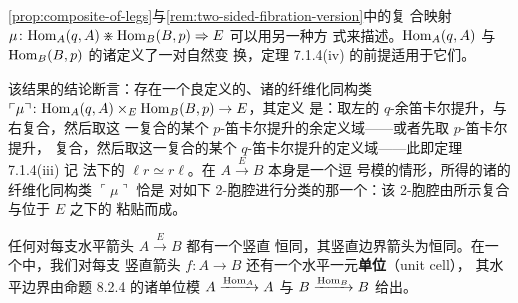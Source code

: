 \begin{remark}\label{rem:comma-cone-description}
\cref{prop:composite-of-legs}与\cref{rem:two-sided-fibration-version}中的复
合映射 $\mu\colon \mathrm{Hom}_{A}(q,A)\divideontimes \mathrm{Hom}_{B}(B,p)\Rightarrow E$ 可以用另一种方
式来描述。$\mathrm{Hom}_{A}(q,A)$ 与 $\mathrm{Hom}_{B}(B,p)$ 的诸\trCommaCone{}定义了一对自然变
换，定理 7.1.4(iv) 的前提适用于它们。
\begin{center}
\end{center}
该结果的结论断言：存在一个良定义的、诸\trFunctor{}的纤维化同构类
$\ulcorner\mu\urcorner\colon \mathrm{Hom}_{A}(q,A)\times_{E}\mathrm{Hom}_{B}(B,p)\to E$，其定义
是：取左\trCommaCone{}的 $q$-余笛卡尔提升，与右\trCommaCone{}复合，然后取这
一复合\trCell{}的某个 $p$-笛卡尔提升的余定义域——或者先取 $p$-笛卡尔提升，
复合，然后取这一复合的某个 $q$-笛卡尔提升的定义域——此即定理 7.1.4(iii) 记
法下的\trFunctor{} $\ell r\simeq r\ell$。在 $A\xrightarrow{E}B$ 本身是一个逗
号模的情形，所得的诸\trFunctor{}的纤维化同构类 $\ulcorner\mu\urcorner$ 恰是
对如下 2-胞腔进行分类的那一个：该 2-胞腔由所示复合与位于 $E$ 之下的%
\trCommaCone{}粘贴而成。
\end{remark}

任何\trVirtualDoubleCategory{}对每支水平箭头 $A\xrightarrow{E}B$ 都有一个竖直
恒同\trCell，其竖直边界箭头为恒同。在一个\trVirtualEquipment{}中，我们对每支
竖直箭头 $f\colon A\to B$ 还有一个水平一元\textbf{单位\trCell}（unit cell），
其水平边界由命题 8.2.4 的诸单位模 $A\xrightarrow{\mathrm{Hom}_{A}}A$ 与
$B\xrightarrow{\mathrm{Hom}_{B}}B$ 给出。

